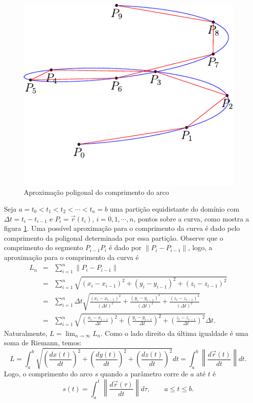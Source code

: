 \begin{figure}
\centering
    \includegraphics{./cap_curvas/figs/helice_retificacao}
\caption{Aproximação poligonal do comprimento do arco}\label{fig_compr_arc}
\end{figure}

 
 
Seja $a=t_0<t_1<t_2<\cdots<t_n=b $ uma partição equidistante do domínio com $\Delta t=t_i-t_{i-1}$ e $P_i=\vec{r}(t_i)$, $i=0,1,\cdots,n$, pontos sobre a curva, como mostra a figura \ref{fig_compr_arc}. Uma possível aproximação para o comprimento da curva é dado pelo comprimento da poligonal determinada por essa partição. Observe que o comprimento do segmento $P_{i-1}P_i$ é dado por $\|P_i-P_{i-1}\|$, logo, a aproximação para o comprimento da curva é
\begin{eqnarray*}
L_n&=&\sum_{i=1}^n\|P_i-P_{i-1}\|\\
&=&\sum_{i=1}^n \sqrt{(x_i-x_{i-1})^2+(y_i-y_{i-1})^2+(z_i-z_{i-1})^2}\\
&=&\sum_{i=1}^n \Delta t \sqrt{\frac{(x_i-x_{i-1})^2}{(\Delta t) ^2}+\frac{(y_i-y_{i-1})^2}{(\Delta t) ^2}+\frac{(z_i-z_{i-1})^2}{(\Delta t) ^2}}\\
&=&\sum_{i=1}^n \sqrt{\left(\frac{x_i-x_{i-1}}{\Delta t }\right)^2+\left(\frac{y_i-y_{i-1}}{\Delta t}\right)^2+\left(\frac{z_i-z_{i-1}}{\Delta t}\right)^2}\Delta t.
\end{eqnarray*}
Naturalmente, $L=\lim_{n\to\infty }L_n$. Como o lado direito da última igualdade é uma soma de Riemann, temos:
\begin{equation}\label{defcomparco}
L=\int_{a}^{b} \sqrt{\left(\frac{dx(t)}{dt}\right)^2+\left(\frac{dy(t)}{dt}\right)^2+\left(\frac{dz(t)}{dt}\right)^2}dt=\int_{a}^{b}\left\|\frac{d\vec{r}(t)}{dt}\right\|dt.
\end{equation}
Logo, o comprimento do arco $s$ quando a parâmetro corre de $a$ até $t$ é
\begin{equation}\label{defcomparco_1}
s(t)=\int_{a}^{t}\left\|\frac{d\vec{r}(\tau)}{dt}\right\|d\tau,\qquad a\leq t\leq b.
\end{equation}

